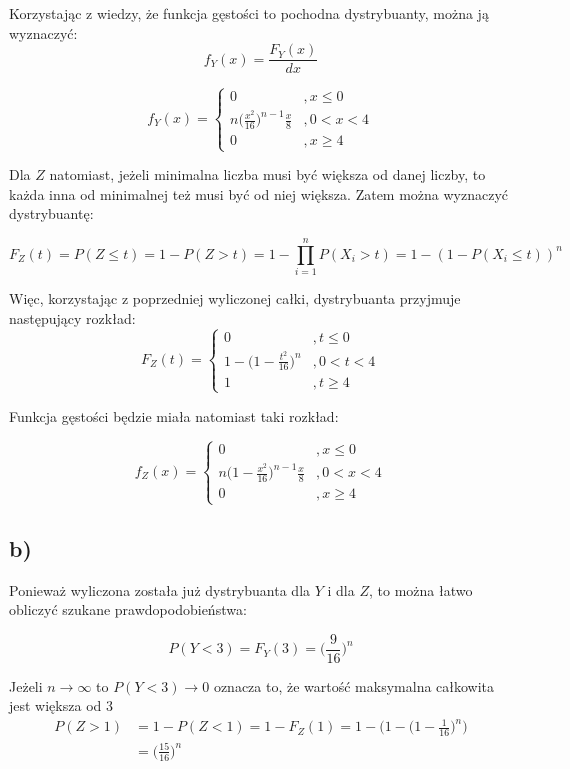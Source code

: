 \documentclass{article}
\begin{document}
{Korzystając z wiedzy, że funkcja gęstości to pochodna dystrybuanty, można ją wyznaczyć:
\[
f_Y(x) = \frac{F_Y(x)}{dx}
\]

\[
f_Y(x) = \left\{
\begin{array}{ll}
0 &, x \leq 0 \\
n \Big( \frac{x^2}{16} \Big)^{n-1} \frac{x}{8} &, 0<x<4 \\
0 &, x \geq 4
\end{array}
\right.
\]

Dla $Z$ natomiast, jeżeli minimalna liczba musi być większa od danej liczby, to każda inna od minimalnej też musi być od niej większa. Zatem można wyznaczyć dystrybuantę:

\[
F_Z(t) = P(Z \leq t) = 1 - P(Z > t) = 1 - \prod_{i=1}^{n} P(X_i > t) = 1 - ( 1 - P(X_i \leq t) )^n
\]

Więc, korzystając z poprzedniej wyliczonej całki, dystrybuanta przyjmuje następujący rozkład:
\[
F_Z(t) = \left\{
\begin{array}{ll}
0 &, t \leq 0 \\
1 - \Big(1 - \frac{t^2}{16} \Big)^n &, 0<t<4 \\
1 &, t \geq 4
\end{array}
\right.
\]

Funkcja gęstości będzie miała natomiast taki rozkład:

\[
f_Z(x) = \left\{
\begin{array}{ll}
0 &, x \leq 0 \\
n \Big(1 - \frac{x^2}{16} \Big)^{n-1} \frac{x}{8} &, 0<x<4 \\
0 &, x \geq 4
\end{array}
\right.
\]

\subsection{b)}
Ponieważ wyliczona została już dystrybuanta dla $Y$ i dla $Z$, to można łatwo obliczyć szukane prawdopodobieństwa:

\[
P(Y<3) = F_Y(3) = \Big( \frac{9}{16} \Big)^n
\]

Jeżeli $n \rightarrow \infty$ to $P(Y<3) \rightarrow 0$ oznacza to, że wartość maksymalna całkowita jest większa od 3\\

\begin{align*}
P(Z>1) & = 1 - P(Z<1) = 1 - F_Z(1) = 1 - \Big( 1 - \Big( 1 - \frac{1}{16} \Big)^n \Big)  \\
& = \Big( \frac{15}{16} \Big)^n
\end{align*}

}
\end{document}
